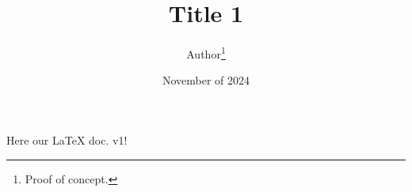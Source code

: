 \documentclass[12pt, letterpaper]{article}
\title{Title 1}
\author{Author\thanks{Proof of concept.}}
\date{November of 2024}
\begin{document}
\maketitle
Here our \LaTeX{} doc. v1!
\end{document}
